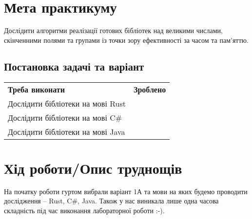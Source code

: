 
\section{Мета практикуму}

Дослідити алгоритми реалізації готових бібліотек над великими числами, скінченними полями та групами із точки зору ефективності за часом та пам'яттю.

\subsection{Постановка задачі та варіант}
\begin{tabularx}{\textwidth}{X|X}
	\textbf{Треба виконати} & \textbf{Зроблено} \\
	Дослідити бібліотеки на мові Rust & \checkmark \\
	Дослідити бібліотеки на мові C\# & \checkmark \\
	Дослідити бібліотеки на мові Java & \checkmark \\
\end{tabularx}

\section{Хід роботи/Опис труднощів}
	На початку роботи гуртом вибрали варіант 1А та мови на яких будемо проводити дослідження -- Rust, C\#, Java. Також у нас виникала лише одна часова складність під час виконання лабораторної роботи :-).